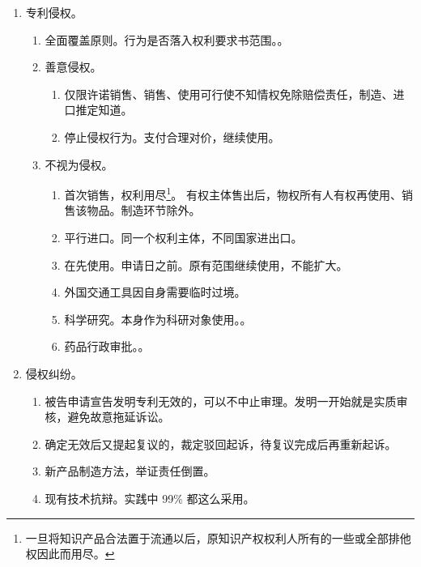 \begin{enumerate}
  \item 专利侵权。
        \begin{enumerate}
          \item 全面覆盖原则。行为是否落入权利要求书范围。。
          \item 善意侵权。
                \begin{enumerate}
                  \item 仅限许诺销售、销售、使用可行使不知情权免除赔偿责任，制造、进口推定知道。
                  \item \yi 停止侵权行为。\er 支付合理对价，继续使用。
                \end{enumerate}
          \item 不视为侵权。
                \begin{enumerate}
                  \item 首次销售，权利用尽\footnote{一旦将知识产品合法置于流通以后，原知识产权权利人所有的一些或全部排他权因此而用尽。}。
                        有权主体售出后，物权所有人有权再使用、销售该物品。制造环节除外。
                  \item 平行进口。同一个权利主体，不同国家进出口。
                  \item 在先使用。申请日之前。原有范围继续使用，不能扩大。
                  \item 外国交通工具因自身需要临时过境。
                  \item 科学研究。本身作为科研对象使用。。
                  \item 药品行政审批。。
                \end{enumerate}
        \end{enumerate}
  \item 侵权纠纷。
        \begin{enumerate}
          \item 被告申请宣告发明专利无效的，可以不中止审理。发明一开始就是实质审核，避免故意拖延诉讼。
          \item 确定无效后又提起复议的，裁定驳回起诉，待复议完成后再重新起诉。
          \item 新产品制造方法，举证责任倒置。
          \item 现有技术抗辩。实践中 99\% 都这么采用。
        \end{enumerate}
\end{enumerate}
